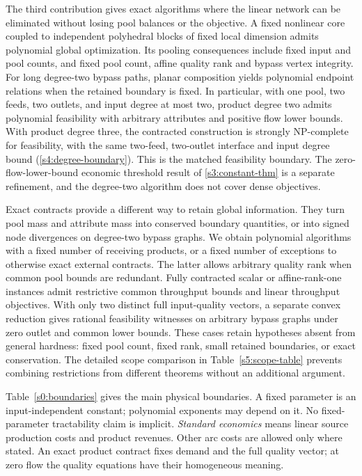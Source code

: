 The third contribution gives exact algorithms where the linear network
can be eliminated without losing pool balances or the objective.
A fixed nonlinear core coupled to independent polyhedral blocks of
fixed local dimension admits polynomial global optimization. Its pooling
consequences include fixed input and pool counts, and fixed pool count,
affine quality rank and bypass vertex integrity. For long degree-two
bypass paths, planar composition yields polynomial endpoint relations
when the retained boundary is fixed. In particular, with one pool, two
feeds, two outlets, and input degree at most two, product degree two
admits polynomial feasibility with arbitrary attributes and positive
flow lower bounds. With product degree three, the contracted construction is strongly
NP-complete for feasibility, with the same two-feed, two-outlet
interface and input degree bound (\cref{s4:degree-boundary}). This
is the matched feasibility boundary. The zero-flow-lower-bound
economic threshold result of \cref{s3:constant-thm} is a separate
refinement, and the degree-two algorithm does not cover dense objectives.

Exact contracts provide a different way to retain global information.
They turn pool mass and attribute mass into conserved boundary quantities,
or into signed node divergences on degree-two bypass graphs. We obtain
polynomial algorithms with a fixed number of receiving products, or a
fixed number of exceptions to otherwise exact external contracts.
The latter allows arbitrary quality rank when common pool bounds are
redundant. Fully contracted scalar or affine-rank-one instances admit
restrictive common throughput bounds and linear throughput objectives.
With only two distinct full input-quality vectors, a separate convex
reduction gives rational feasibility witnesses on arbitrary bypass
graphs under zero outlet and common lower bounds. These cases retain
hypotheses absent from general hardness: fixed pool count, fixed rank,
small retained boundaries, or exact conservation. The detailed scope
comparison in Table~\ref{s5:scope-table} prevents combining restrictions
from different theorems without an additional argument.

Table~\ref{s0:boundaries} gives the main physical boundaries. A fixed
parameter is an input-independent constant; polynomial exponents may
depend on it. No fixed-parameter tractability claim is implicit.
\emph{Standard economics} means linear source production costs and
product revenues. Other arc costs are allowed only where stated.
An exact product contract fixes demand and the full quality vector;
at zero flow the quality equations have their homogeneous meaning.

